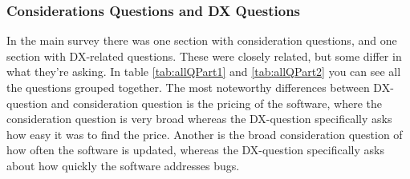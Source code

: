\documentclass{cslthse-msc}
\begin{document}
    \subsubsection{Considerations Questions and DX Questions}\label{consisQuestions}
    In the main survey there was one section with consideration questions, and one section with DX-related questions. These were closely related, but some differ in what they're asking. In table \ref{tab:allQPart1} and \ref{tab:allQPart2} you can see all the questions grouped together. The most noteworthy differences between DX-question and consideration question is the pricing of the software, where the consideration question is very broad whereas the DX-question specifically asks how easy it was to find the price. Another is the broad consideration question of how often the software is updated, whereas the DX-question specifically asks about how quickly the software addresses bugs.
\end{document}

